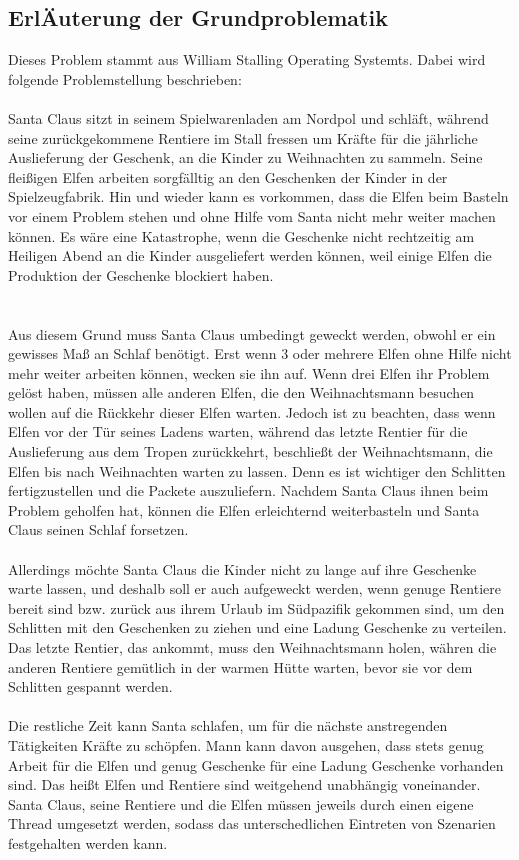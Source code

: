 \documentclass[a4paper,12pt]{article}
\begin{document}
\subsection{ErlÄuterung der Grundproblematik}
Dieses Problem stammt aus William Stalling Operating Systemts. Dabei wird folgende Problemstellung beschrieben:\\ 
\\Santa Claus sitzt in seinem Spielwarenladen am Nordpol und schläft, während seine zurückgekommene Rentiere im Stall fressen
um Kräfte für die jährliche Auslieferung der Geschenk, an die Kinder zu Weihnachten zu sammeln. Seine fleißigen Elfen arbeiten sorgfälltig an den Geschenken der Kinder
in der Spielzeugfabrik. Hin und wieder kann es vorkommen, dass die Elfen beim Basteln vor einem Problem stehen und ohne Hilfe vom Santa nicht mehr weiter machen können.
Es wäre eine Katastrophe, wenn die Geschenke nicht rechtzeitig am Heiligen Abend an die Kinder ausgeliefert werden können, weil einige Elfen die Produktion der Geschenke blockiert haben. \\\\
\\Aus diesem Grund muss Santa Claus umbedingt geweckt werden, obwohl er ein gewisses Maß an Schlaf benötigt. Erst wenn 3 oder mehrere Elfen ohne Hilfe nicht mehr weiter arbeiten können, wecken sie ihn auf.
Wenn drei Elfen ihr Problem gelöst haben, müssen alle anderen Elfen, die den Weihnachtsmann besuchen wollen auf die Rückkehr dieser Elfen warten.
Jedoch ist zu beachten, dass wenn Elfen vor der Tür seines Ladens warten, während das letzte Rentier für die Auslieferung aus dem Tropen zurückkehrt, beschließt der Weihnachtsmann, die Elfen bis nach Weihnachten warten zu lassen. Denn es ist wichtiger den Schlitten
fertigzustellen und die Packete auszuliefern.
Nachdem Santa Claus ihnen beim Problem geholfen hat, können die Elfen erleichternd weiterbasteln und Santa Claus seinen Schlaf forsetzen.\\
\\Allerdings möchte Santa Claus die Kinder nicht zu lange auf ihre Geschenke warte lassen, und deshalb soll er auch aufgeweckt werden, wenn genuge Rentiere bereit sind bzw. zurück aus ihrem Urlaub im Südpazifik gekommen sind, um den 
Schlitten mit den Geschenken zu ziehen und eine Ladung Geschenke zu verteilen. Das letzte Rentier, das ankommt, muss den Weihnachtsmann holen, währen die anderen Rentiere gemütlich in der warmen Hütte warten, bevor sie vor dem Schlitten gespannt werden.\\
\\Die restliche Zeit kann Santa schlafen, um für die nächste anstregenden Tätigkeiten Kräfte zu schöpfen. Mann kann davon ausgehen, dass stets genug Arbeit für die Elfen und genug Geschenke für eine Ladung Geschenke vorhanden sind.
Das heißt Elfen und Rentiere sind weitgehend unabhängig voneinander. Santa Claus, seine Rentiere und die Elfen müssen jeweils durch einen eigene Thread umgesetzt werden, sodass das unterschedlichen Eintreten von Szenarien festgehalten werden kann.
\end{document}
